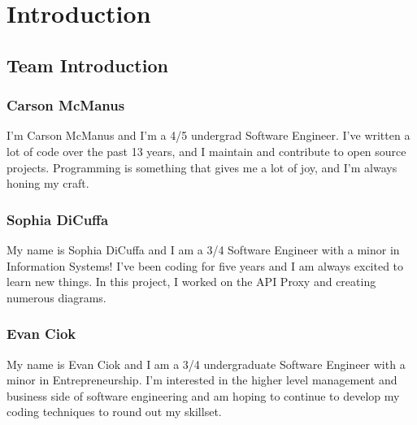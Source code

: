 \chapter{Introduction
  \label{Chapter::Introduction}}

\section{Team Introduction \label{Section::TeamIntroduction}}

\subsection{Carson McManus}

I'm Carson McManus and I'm a 4/5 undergrad Software Engineer. I've written a lot of code over the past 13 years, and I maintain and contribute to open source projects. Programming is something that gives me a lot of joy, and I'm always honing my craft.

\subsection{Sophia DiCuffa}

My name is Sophia DiCuffa and I am a 3/4 Software Engineer with a minor in Information Systems! I've been coding for five years and I am always excited to learn new things.
In this project, I worked on the API Proxy and creating numerous diagrams.

\subsection{Evan Ciok}

My name is Evan Ciok and I am a 3/4 undergraduate Software Engineer with a minor in Entrepreneurship. I'm interested in the higher level management and business side of software engineering and am hoping to continue to develop my coding techniques to round out my skillset.